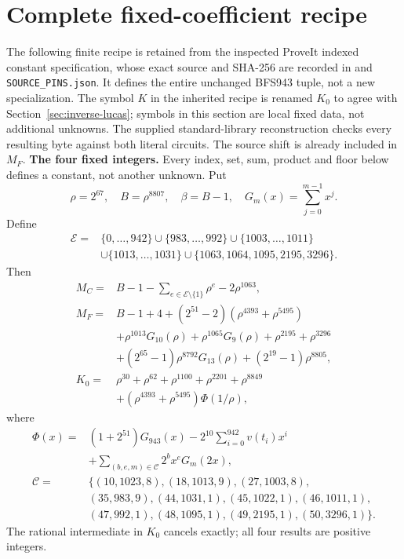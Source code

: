\section{Complete fixed-coefficient recipe}\label{sec:inverse-constants}
The following finite recipe is retained from the inspected ProveIt indexed
constant specification, whose exact source and SHA-256 are recorded in
 and
\texttt{SOURCE\_PINS.json}. It defines the entire unchanged
BFS943 tuple, not a new specialization. The symbol $K$ in the inherited
recipe is renamed $K_0$ to agree with Section~\ref{sec:inverse-lucas}; symbols
in this section are local fixed data, not additional unknowns. The supplied
standard-library reconstruction checks every resulting byte against both
literal circuits. The source shift is already included in $M_F$.
\begingroup
\providecommand{\fl}[1]{\left\lfloor#1\right\rfloor}
\providecommand{\rg}[2]{\{#1,\ldots,#2\}}
\textbf{The four fixed integers.}
Every index, set, sum, product and floor below defines a constant, not
another unknown. Put
\[
\rho=2^{67},\quad B=\rho^{8807},\quad\beta=B-1,\quad
G_m(x)=\sum_{j=0}^{m-1}x^j.
\]
Define
\[
\begin{split}
\mathcal E={}&\rg0{942}\cup\rg{983}{992}\cup\rg{1003}{1011}\\
&\cup\rg{1013}{1031}\cup\{1063,1064,1095,2195,3296\}.
\end{split}
\]
Then
\begin{align*}
M_C={}&B-1-\sum_{e\in\mathcal E\setminus\{1\}}\rho^e-2\rho^{1063},\\
M_F={}&B-1+4+(2^{51}-2)(\rho^{4393}+\rho^{5495})\\
&+\rho^{1013}G_{10}(\rho)+\rho^{1065}G_9(\rho)
  +\rho^{2195}+\rho^{3296}\\
&+(2^{65}-1)\rho^{8792}G_{13}(\rho)+(2^{19}-1)\rho^{8805},\\
K_0={}&\rho^{30}+\rho^{62}+\rho^{1100}+\rho^{2201}+\rho^{8849}\\
&+(\rho^{4393}+\rho^{5495})\Phi(1/\rho),
\end{align*}
where
\[
\begin{split}
\Phi(x)={}&(1+2^{51})G_{943}(x)
 -2^{10}\sum_{i=0}^{942}v(t_i)x^i\\
&+\sum_{(b,e,m)\in\mathcal C}2^b x^e G_m(2x),\\
\mathcal C={}&\{(10,1023,8),(18,1013,9),(27,1003,8),\\
&(35,983,9),(44,1031,1),(45,1022,1),(46,1011,1),\\
&(47,992,1),(48,1095,1),(49,2195,1),(50,3296,1)\}.
\end{split}
\]
The rational intermediate in $K_0$ cancels exactly; all four results are positive integers.

